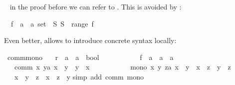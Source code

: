 \begin{isabellebody}
\begin{isamarkuptext}
~ in the proof before we can refer to .
This is avoided by :%
\end{isamarkuptext}%
\isamarkupfalse%
\ \ f\ {\isacharcolon}{\isacharcolon}\ {\isachardoublequote}{\isacharprime}a\ {\isasymRightarrow}\ {\isacharprime}a\ set{\isachardoublequote}\ \ {\isachardoublequote}{\isasymexists}S{\isachardot}\ S\ {\isasymnotin}\ range\ f{\isachardoublequote}%
\isadelimproof
%
\endisadelimproof
%
\isatagproof
%
\endisatagproof
{\isafoldproof}%
%
\isadelimproof
%
\endisadelimproof
\isamarkuptrue%
%
\begin{isamarkuptext}%
\noindent
Even better,  allows to introduce concrete syntax locally:%
\end{isamarkuptext}%
\isamarkupfalse%
\ comm{\isacharunderscore}mono{\isacharcolon}\isanewline
\ \ \ r\ {\isacharcolon}{\isacharcolon}\ {\isachardoublequote}{\isacharprime}a\ {\isasymRightarrow}\ {\isacharprime}a\ {\isasymRightarrow}\ bool{\isachardoublequote}\ {\isacharparenleft}\ {\isachardoublequote}{\isachargreater}{\isachardoublequote}\ {}{}{\isacharparenright}\ \isanewline
\ \ \ \ \ \ \ f\ {\isacharcolon}{\isacharcolon}\ {\isachardoublequote}{\isacharprime}a\ {\isasymRightarrow}\ {\isacharprime}a\ {\isasymRightarrow}\ {\isacharprime}a{\isachardoublequote}\ \ \ {\isacharparenleft}\ {\isachardoublequote}{\isacharplus}{\isacharplus}{\isachardoublequote}\ {}{}{\isacharparenright}\isanewline
\ \ \ comm{\isacharcolon}\ {\isachardoublequote}{\isasymAnd}x\ y{\isacharcolon}{\isacharcolon}{\isacharprime}a{\isachardot}\ x\ {\isacharplus}{\isacharplus}\ y\ {\isacharequal}\ y\ {\isacharplus}{\isacharplus}\ x{\isachardoublequote}\ \isanewline
\ \ \ \ \ \ \ \ \ \ mono{\isacharcolon}\ {\isachardoublequote}{\isasymAnd}x\ y\ z{\isacharcolon}{\isacharcolon}{\isacharprime}a{\isachardot}\ x\ {\isachargreater}\ y\ {\isasymLongrightarrow}\ x\ {\isacharplus}{\isacharplus}\ z\ {\isachargreater}\ y\ {\isacharplus}{\isacharplus}\ z{\isachardoublequote}\isanewline
\ \ \ {\isachardoublequote}x\ {\isachargreater}\ y\ {\isasymLongrightarrow}\ z\ {\isacharplus}{\isacharplus}\ x\ {\isachargreater}\ z\ {\isacharplus}{\isacharplus}\ y{\isachardoublequote}\isanewline
%
\isadelimproof
%
\endisadelimproof
%
\isatagproof
\isamarkupfalse%
simp\ add{\isacharcolon}\ comm\ mono{\isacharparenright}%

\end{isabellebody}

